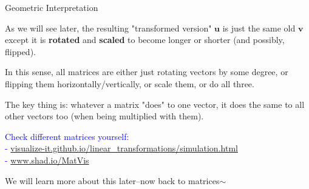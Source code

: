 \documentclass{beamer}
\newcommand{\vv}{\mathbf{v}}
\newcommand{\vu}{\mathbf{u}}
\begin{document}
\begin{frame}{Geometric Interpretation }

As we will see later, the resulting "transformed version" $\vu$ is just the same old $\vv$ except it is \textbf{rotated} and \textbf{scaled} to become longer or shorter (and possibly, flipped).

\pause 

\bigskip

In this sense, all  matrices are either just rotating vectors by some degree, or flipping them horizontally/vertically, or scale them, or do all three.

\smallskip 

The key thing is: whatever a matrix "does" to one vector, it does the same to all other vectors too (when being multiplied with them).

\bigskip
\bigskip


{\small
\textcolor{blue}{Check different matrices yourself:\\ - \url{visualize-it.github.io/linear_transformations/simulation.html} 
\\ - \url{www.shad.io/MatVis}
}}

\bigskip

We will learn more about this later--now back to matrices$\sim$

    
\end{frame}





\end{document}
